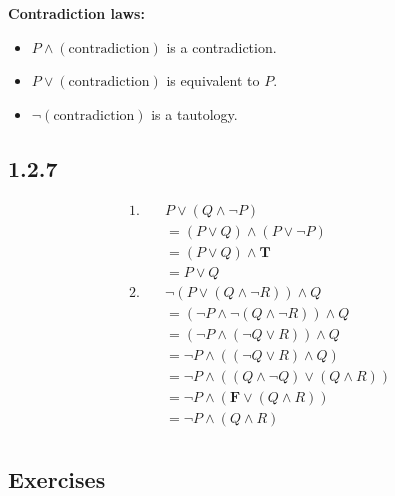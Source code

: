 \documentclass{article} %
\begin{document}
    \textbf{Contradiction laws:}
    \begin{itemize}[itemsep=5pt,parsep=0pt,topsep=5pt]
        \item \begin{center}$P \land (\text{contradiction})$ is a contradiction.\end{center}
        \item \begin{center}$P \lor (\text{contradiction})$ is equivalent to $P$.\end{center}
        \item \begin{center}$\neg(\text{contradiction})$ is a tautology.\end{center}
    \end{itemize}

    \subsection*{1.2.7}

    \begin{align*}
        1. &\quad P \lor (Q \land \neg P) \\
        &\quad = (P \lor Q) \land (P \lor \neg P) \\
        &\quad = (P \lor Q) \land \textbf{T} \\
        &\quad = P \lor Q \\
        2. &\quad \neg (P \lor (Q \land \neg R)) \land Q \\
        &\quad = (\neg P \land \neg (Q \land \neg R)) \land Q \\
        &\quad = (\neg P \land (\neg Q \lor R)) \land Q \\
        &\quad = \neg P \land ((\neg Q \lor R) \land Q) \\
        &\quad = \neg P \land ((Q \land \neg Q) \lor (Q \land R)) \\
        &\quad = \neg P \land (\textbf{F} \lor (Q \land R)) \\
        &\quad = \neg P \land (Q \land R) \\
    \end{align*}

    \newpage

    \subsection*{Exercises} %
    
\end{document}
